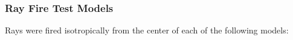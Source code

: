 \documentclass[12pt]{beamer}
\begin{document}
\begin{frame}
\frametitle{Ray Fire Test Models}

Rays were fired isotropically from the center of each of the following models:
\vfill

\end{frame}
\end{document}
